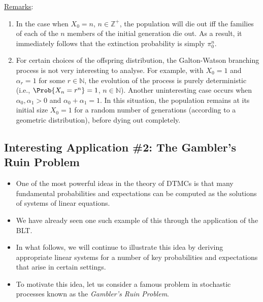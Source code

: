 \noindent\underline{Remarks}:
\begin{enumerate}[(1)]
    \item In the case when $ X_0=n $, $ n\in\mathbb{Z}^+ $, the population will die out iff the families of each of
          the $n$ members of the initial generation die out. As a result, it immediately follows that
          the extinction probability is simply $ \pi_0^n $.
    \item For certain choices of the offspring distribution, the Galton-Watson branching process is
          not very interesting to analyse. For example, with $ X_0=1 $ and $ \alpha_r=1 $ for some $ r\in\mathbb{N} $,
          the evolution of the process is purely deterministic (i.e., $ \Prob{X_n=r^n}=1 $, $ n\in\mathbb{N} $). Another
          uninteresting case occurs when $ \alpha_0,\alpha_1>0 $ and $ \alpha_0+\alpha_1=1 $. In this situation, the
          population remains at its initial size $ X_0=1 $ for a random number of generations
          (according to a geometric distribution), before dying out completely.
\end{enumerate}
\subsection{Interesting Application \#2: The Gambler's Ruin Problem}
\begin{itemize}
    \item One of the most powerful ideas in the theory of DTMCs is that many fundamental
          probabilities and expectations can be computed as the solutions of systems of linear equations.
    \item We have already seen one such example of this through the application of the BLT\@.
    \item In what follows, we will continue to illustrate this idea by deriving appropriate linear systems
          for a number of key probabilities and expectations that arise in certain settings.
    \item To motivate this idea, let us consider a famous problem in stochastic processes known as the
          \emph{Gambler's Ruin Problem}.
\end{itemize}
